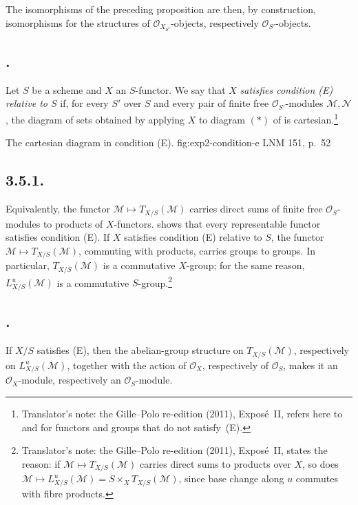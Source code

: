 The isomorphisms of the preceding proposition are then, by construction,
isomorphisms for the structures of \(\mathcal O_{X_{S'}}\)-objects,
respectively \(\mathcal O_{S'}\)-objects.

\subsection*{.}
Let \(S\) be a scheme and \(X\) an \(S\)-functor. We say that \(X\)
\emph{satisfies condition (E) relative to \(S\)} if, for every \(S'\)
over \(S\) and every pair of finite free \(\mathcal O_{S'}\)-modules
\(\mathcal M,\mathcal N\), the diagram of sets obtained by applying \(X\)
to diagram \((*)\) of  is cartesian.\footnote{Translator's
note: the Gille--Polo re-edition (2011), Expos\'e~II, refers here to
 and  for functors and groups that do not satisfy~(E).}

  {The cartesian diagram in condition (E).}
  {fig:exp2-condition-e}
  {LNM 151, p.~52}

\subsection*{3.5.1.}
Equivalently, the functor
\(\mathcal M\mapsto T_{X/S}(\mathcal M)\) carries direct sums of finite
free \(\mathcal O_S\)-modules to products of \(X\)-functors.
 shows that every representable functor satisfies
condition (E). If \(X\) satisfies condition (E) relative to \(S\), the
functor \(\mathcal M\mapsto T_{X/S}(\mathcal M)\), commuting with products,
carries groups to groups. In particular, \(T_{X/S}(\mathcal M)\) is a
commutative \(X\)-group; for the same reason,
\(L^u_{X/S}(\mathcal M)\) is a commutative \(S\)-group.\footnote{Translator's
note: the Gille--Polo re-edition (2011), Expos\'e~II, states the reason: if
\(\mathcal M\mapsto T_{X/S}(\mathcal M)\) carries direct sums to products
over \(X\), so does \(\mathcal M\mapsto
L^u_{X/S}(\mathcal M)=S\times_XT_{X/S}(\mathcal M)\), since base change
along \(u\) commutes with fibre products.}

\subsection*{.}
If \(X/S\) satisfies (E), then the abelian-group structure on
\(T_{X/S}(\mathcal M)\), respectively on \(L^u_{X/S}(\mathcal M)\),
together with the action of \(\mathcal O_X\), respectively of
\(\mathcal O_S\), makes it an \(\mathcal O_X\)-module, respectively an
\(\mathcal O_S\)-module.


